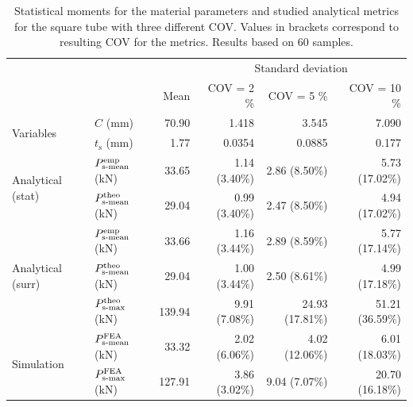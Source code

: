 \documentclass[12pt,number,preprint,review,times]{elsarticle}
\begin{document}
\begin{table}[!htpb]
\begin{center}
\begin{tabular}[t]{llrrrr} \toprule
 & &  &  \multicolumn{3}{c}{Standard deviation}  \\\cmidrule{4-6}
&  & Mean       &    COV = 2 \%  &  COV = 5 \%      &    COV = 10 \%  \\\midrule
\multirow{2}{*}{Variables} &  $C$ (mm) &  70.90 &  1.418 & 3.545 & 7.090   \\
& $t_\mathrm{s}$ (mm) &  1.77 & 0.0354 & 0.0885 & 0.177 \\ \midrule
\multirow{2}{*}{Analytical (stat)} & $P^{\mathrm{emp}}_{\mathrm{s{\text -}mean}}$ (kN) & 33.65  & 1.14 (3.40\%) & 2.86 (8.50\%) & 5.73 (17.02\%)   \\
& $P^{\mathrm{theo}}_{\mathrm{s{\text -}mean}}$ (kN) & 29.04  & 0.99 (3.40\%) & 2.47 (8.50\%) & 4.94 (17.02\%)  \\\midrule
\multirow{3}{*}{Analytical (surr)} & $P^{\mathrm{emp}}_{\mathrm{s{\text -}mean}}$ (kN) & 33.66  & 1.16 (3.44\%) & 2.89 (8.59\%) & 5.77 (17.14\%)    \\
& $P^{\mathrm{theo}}_{\mathrm{s{\text -}mean}}$ (kN) & 29.04  & 1.00 (3.44\%) & 2.50 (8.61\%) & 4.99 (17.18\%)   \\
& $P^{\mathrm{theo}}_{\mathrm{s{\text -}max}}$ (kN) & 139.94  & 9.91 (7.08\%) & 24.93 (17.81\%) & 51.21 (36.59\%) \\ \midrule
\multirow{2}{*}{Simulation} & $P^{\mathrm{FEA}}_{\mathrm{s{\text -}mean}}$ (kN) & 33.32  & 2.02 (6.06\%) & 4.02 (12.06\%) & 6.01 (18.03\%)  \\
& $P^{\mathrm{FEA}}_{\mathrm{s{\text -}max}}$ (kN) & 127.91 & 3.86 (3.02\%) & 9.04 (7.07\%) & 20.70 (16.18\%) \\
\bottomrule
\end{tabular}
\captionsetup{justification=centering}
\caption{Statistical moments for the material parameters and studied analytical metrics for the square tube with three different COV. Values in brackets correspond to resulting COV for the metrics. Results based on 60 samples.}
\label{tab:analytical_sq}
\end{center}
\end{table}
\end{document}
